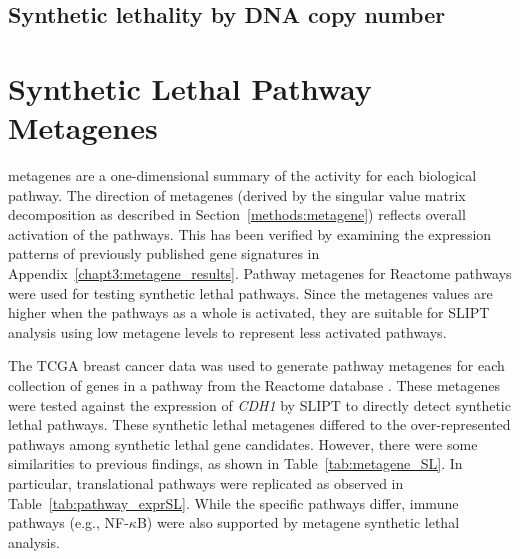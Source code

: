 \subsection{Synthetic lethality by \acrshort{DNA} copy number}


\fi

\FloatBarrier

\section{Synthetic Lethal Pathway Metagenes} \label{chapt3:metagene_SL}

\Glspl{metagene} are a one-dimensional summary of the activity for each biological \gls{pathway}. The direction of \glspl{metagene} (derived by the singular value matrix decomposition as described in Section~\ref{methods:metagene}) reflects overall activation of the \glspl{pathway}. This has been verified by examining the expression patterns of previously published gene signatures \citep{Gatza2011, Gatza2014} in Appendix~\ref{chapt3:metagene_results}.
%
Pathway \glspl{metagene} for Reactome \glspl{pathway} %
were used for testing \gls{synthetic lethal} \glspl{pathway}. Since the \glspl{metagene} values are higher when the \glspl{pathway} as a whole is activated, they are suitable for \gls{SLIPT} analysis using low \gls{metagene} levels to represent less activated \glspl{pathway}. 

The \gls{TCGA} breast cancer  data was used to generate \gls{pathway} \glspl{metagene} for each collection of genes in a \gls{pathway} from the Reactome database \citep{Reactome}. These metagenes were tested against the expression of \textit{CDH1} by \gls{SLIPT} to directly detect \gls{synthetic lethal} \glspl{pathway}.
These \gls{synthetic lethal} \glspl{metagene} differed to the over-represented \glspl{pathway} among \gls{synthetic lethal} gene candidates. However, there were some similarities to previous findings, as shown in Table~\ref{tab:metagene_SL}. In particular, translational \glspl{pathway} were replicated as observed in Table~\ref{tab:pathway_exprSL}. While the specific \glspl{pathway} differ, immune \glspl{pathway} (e.g., NF-$\kappa$B) were also supported by \gls{metagene} \gls{synthetic lethal} analysis.

